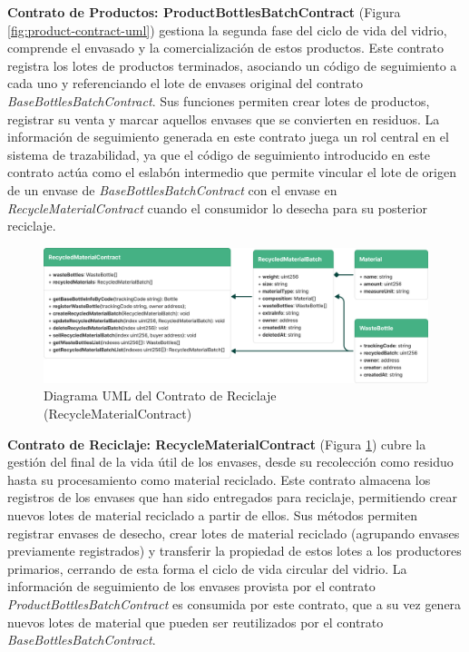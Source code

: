 \textbf{Contrato de Productos: ProductBottlesBatchContract} (Figura \ref{fig:product-contract-uml})
 gestiona la segunda fase del ciclo de vida del vidrio, comprende el envasado y la comercialización de estos productos. Este contrato registra los lotes de productos terminados, asociando un código de seguimiento a cada uno y referenciando el lote de envases original del contrato \textit{BaseBottlesBatchContract}. Sus funciones permiten crear lotes de productos, registrar su venta y marcar aquellos envases que se convierten en residuos. La información de seguimiento generada en este contrato juega un rol central en el sistema de trazabilidad, ya que el código de seguimiento introducido en este contrato actúa como el eslabón intermedio que permite vincular el lote de origen de un envase de \textit{BaseBottlesBatchContract} con el envase en \textit{RecycleMaterialContract} cuando el consumidor lo desecha para su posterior reciclaje.

\begin{figure}[!htb]
    \centering
    \includegraphics[width=\linewidth]{Figures/uml-recycling-contract.png}
    \caption{Diagrama UML del Contrato de Reciclaje (RecycleMaterialContract)}
    \label{fig:recycling-contract-uml}
\end{figure}

\textbf{Contrato de Reciclaje: RecycleMaterialContract} (Figura \ref{fig:recycling-contract-uml})
 cubre la gestión del final de la vida útil de los envases, desde su recolección como residuo hasta su procesamiento como material reciclado. Este contrato almacena los registros de los envases que han sido entregados para reciclaje, permitiendo crear nuevos lotes de material reciclado a partir de ellos. Sus métodos permiten registrar envases de desecho, crear lotes de material reciclado (agrupando envases previamente registrados) y transferir la propiedad de estos lotes a los productores primarios, cerrando de esta forma el ciclo de vida circular del vidrio. La información de seguimiento de los envases provista por el contrato \textit{ProductBottlesBatchContract} es consumida por este contrato, que a su vez genera nuevos lotes de material que pueden ser reutilizados por el contrato \textit{BaseBottlesBatchContract}.

